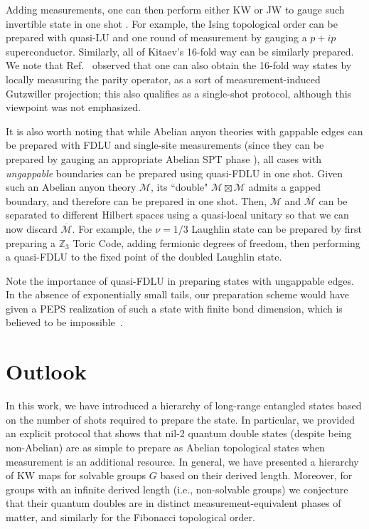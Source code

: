 \documentclass[nofootinbib,prx,twocolumn,showpacs,superscriptaddress,notitlepage,amsmath,amssymb]{revtex4-2}
\theoremstyle{definition}
\def\ZZ{\mathbb Z}
\begin{document}
Adding measurements, one can then perform either KW or JW to gauge such invertible state in one shot \cite{measureSPT}. For example, the Ising topological order can be prepared with quasi-LU and one round of measurement by gauging a $p+ip$ superconductor. Similarly, all of Kitaev's 16-fold way can be similarly prepared. We note that Ref.~\cite{LuHsieh} observed that one can also obtain the 16-fold way states by locally measuring the parity operator, as a sort of measurement-induced Gutzwiller projection; this also qualifies as a single-shot protocol, although this viewpoint was not emphasized.

It is also worth noting that while Abelian anyon theories with gappable edges can be prepared with FDLU and single-site measurements (since they can be prepared by gauging an appropriate Abelian SPT phase \cite{KS11,Kaidi2021higher}), all cases with \emph{ungappable} boundaries can be prepared using quasi-FDLU in one shot. Given such an Abelian anyon theory $\mathcal M$,  its ``double" $\mathcal M \boxtimes \overline{\mathcal M}$ admits a gapped boundary, and therefore can be prepared in one shot. Then, $\mathcal M$ and $\overline{\mathcal M}$ can be separated to different Hilbert spaces using a quasi-local unitary so that we can now discard $\overline{\mathcal M}$. For example, the $\nu=1/3$ Laughlin state\cite{Laughlin83} can be prepared by first preparing a $\ZZ_3$ Toric Code, adding fermionic degrees of freedom, then performing a quasi-FDLU to the fixed point of the doubled Laughlin state.

Note the importance of quasi-FDLU in preparing states with ungappable edges. In the absence of exponentially small tails, our preparation scheme would have given a PEPS realization of such a state with finite bond dimension, which is believed to be impossible~\cite{kitaev_anyons_2005,DubailRead15,FK_CommProj2019,SK_CommProj2020}.



\section{Outlook}\label{sec:outlook}
In this work, we have introduced a hierarchy of long-range entangled states based on the number of shots required to prepare the state.  In particular, we provided an explicit protocol that shows that nil-2 quantum double states (despite being non-Abelian) are as simple to prepare as Abelian topological states when measurement is an additional resource. In general, we have presented a hierarchy of KW maps for solvable groups $G$ based on their derived length. Moreover, for groups with an infinite derived length (i.e., non-solvable groups) we conjecture that their quantum doubles are in distinct measurement-equivalent phases of matter, and similarly for the Fibonacci topological order.
\end{document}
